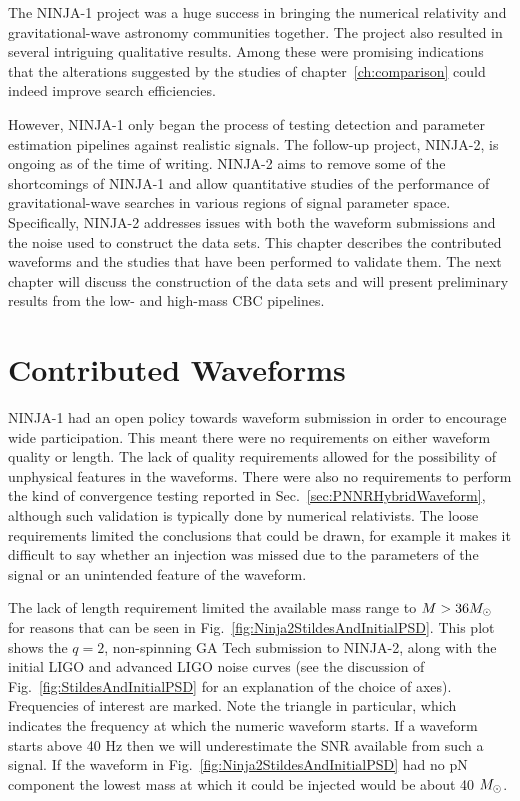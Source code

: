 The NINJA-1 project was a huge success in bringing the numerical
relativity and gravitational-wave astronomy communities together.  The
project also resulted in several intriguing qualitative results.
Among these were promising indications that the alterations suggested 
by the studies of chapter~\ref{ch:comparison} could indeed improve
search efficiencies.

However, NINJA-1 only began the process of testing detection and
parameter estimation pipelines against realistic signals.  The
follow-up project, NINJA-2, is ongoing as of the time of writing.
NINJA-2 aims to remove some of the shortcomings of NINJA-1 and allow
quantitative studies of the performance of gravitational-wave searches
in various regions of signal parameter space.  Specifically, NINJA-2
addresses issues with both the waveform submissions and the noise used
to construct the data sets.  This chapter describes the contributed
waveforms and the studies that have been performed to validate them.
The next chapter will discuss the construction of the data sets and
will present preliminary results from the low- and high-mass CBC
pipelines.

\section{Contributed Waveforms}

NINJA-1 had an open policy towards waveform submission in order to
encourage wide participation.  This meant there were no requirements
on either waveform quality or length.  The lack of quality
requirements allowed for the possibility of unphysical features in the
waveforms.  There were also no requirements to perform the kind of
convergence testing reported in Sec.~\ref{sec:PNNRHybridWaveform},
although such validation is typically done by numerical
relativists.  The loose requirements limited the conclusions that
could be drawn, for example it makes it difficult to say whether an
injection was missed due to the parameters of the signal or an
unintended feature of the waveform.

The lack of length requirement limited the available mass range to $M
> 36 M_\odot$ for reasons that can be seen in
Fig.~\ref{fig:Ninja2StildesAndInitialPSD}.  This plot shows the
$q=2$, non-spinning GA Tech submission to NINJA-2, along with the
initial LIGO and advanced LIGO noise curves (see the discussion of
Fig.~\ref{fig:StildesAndInitialPSD} for an explanation of the choice
of axes).  Frequencies of interest are marked.  Note the triangle in
particular, which indicates the frequency at which the numeric
waveform starts.  If a waveform starts above 40 Hz then we will
underestimate the SNR available from such a signal.  If the
waveform in Fig.~\ref{fig:Ninja2StildesAndInitialPSD} had no 
pN component the lowest mass at which it could be injected would be
about 40 $M_\odot$.


